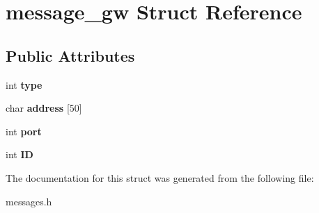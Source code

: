 \hypertarget{structmessage__gw}{}\section{message\+\_\+gw Struct Reference}
\label{structmessage__gw}
\subsection*{Public Attributes}
\begin{DoxyCompactItemize}
\item 
int {\bfseries type}\hypertarget{structmessage__gw_abcae3ea0d22c7bd0dedb70fc3d6864df}{}\label{structmessage__gw_abcae3ea0d22c7bd0dedb70fc3d6864df}

\item 
char {\bfseries address} \mbox{[}50\mbox{]}\hypertarget{structmessage__gw_aa8a45fc9b95b7163fdd38bf72883b3fd}{}\label{structmessage__gw_aa8a45fc9b95b7163fdd38bf72883b3fd}

\item 
int {\bfseries port}\hypertarget{structmessage__gw_abf414952b2d314d95c3060f7b809d745}{}\label{structmessage__gw_abf414952b2d314d95c3060f7b809d745}

\item 
int {\bfseries ID}\hypertarget{structmessage__gw_a6924f58d3391cd833d1de933fc2395c1}{}\label{structmessage__gw_a6924f58d3391cd833d1de933fc2395c1}

\end{DoxyCompactItemize}


The documentation for this struct was generated from the following file\+:\begin{DoxyCompactItemize}
\item 
messages.\+h\end{DoxyCompactItemize}
